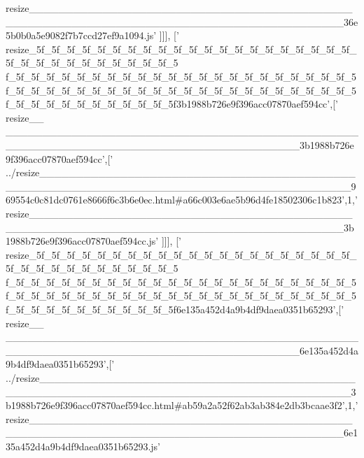 \begin{DoxyCode}
{      resize\_\_\_\_\_\_\_\_\_\_\_\_\_\_\_\_\_\_\_\_\_\_\_\_\_\_\_\_\_\_\_\_\_\_\_\_\_\_\_\_\_\_\_\_\_\_\_\_\_\_\_\_\_\_\_\_\_\_\_\_\_\_\_\_\_\_\_\_\_\_\_\_\_\_\_\_\_\_\_\_\_\_\_\_\_\_\_\_\_\_36e5b0b0a5e9082f7b7ccd27ef9a1094.js'}
      ]]],
  [\textcolor{stringliteral}{'
      resize\_5f\_5f\_5f\_5f\_5f\_5f\_5f\_5f\_5f\_5f\_5f\_5f\_5f\_5f\_5f\_5f\_5f\_5f\_5f\_5f\_5f\_5f\_5f\_5f\_5f\_5f\_5f\_5f\_5f\_5f\_5f\_5f\_5
      f\_5f\_5f\_5f\_5f\_5f\_5f\_5f\_5f\_5f\_5f\_5f\_5f\_5f\_5f\_5f\_5f\_5f\_5f\_5f\_5f\_5f\_5f\_5f\_5f\_5f\_5f\_5f\_5f\_5f\_5f\_5f\_5f\_5f\_5f\_5f\_5f\_5f\_5f\_5f\_5f\_5f\_5f\_5f\_5f\_5f\_5f\_5f\_5f\_5f\_5f\_5f\_5f\_5f\_5f\_5f\_5f\_5f3b1988b726e9f396acc07870aef594cc'},[\textcolor{stringliteral}{'
      resize\_\_
      \_\_\_\_\_\_\_\_\_\_\_\_\_\_\_\_\_\_\_\_\_\_\_\_\_\_\_\_\_\_\_\_\_\_\_\_\_\_\_\_\_\_\_\_\_\_\_\_\_\_\_\_\_\_\_\_\_\_\_\_\_\_\_\_\_\_\_\_\_\_\_\_\_\_\_\_\_\_\_\_\_\_\_\_\_\_\_\_3b1988b726e9f396acc07870aef594cc'},[\textcolor{stringliteral}{'
      ../resize\_\_\_\_\_\_\_\_\_\_\_\_\_\_\_\_\_\_\_\_\_\_\_\_\_\_\_\_\_\_\_\_\_\_\_\_\_\_\_\_\_\_\_\_\_\_\_\_\_\_\_\_\_\_\_\_\_\_\_\_\_\_\_\_\_\_\_\_\_\_\_\_\_\_\_\_\_\_\_\_\_\_\_\_\_\_\_\_\_\_969554c0c81dc0761e8666f6c3b6e0ec.html#a66c003e6ae5b96d4fe18502306c1b823'},1,\textcolor{stringliteral}{'
      resize\_\_\_\_\_\_\_\_\_\_\_\_\_\_\_\_\_\_\_\_\_\_\_\_\_\_\_\_\_\_\_\_\_\_\_\_\_\_\_\_\_\_\_\_\_\_\_\_\_\_\_\_\_\_\_\_\_\_\_\_\_\_\_\_\_\_\_\_\_\_\_\_\_\_\_\_\_\_\_\_\_\_\_\_\_\_\_\_\_\_3b1988b726e9f396acc07870aef594cc.js'}
      ]]],
  [\textcolor{stringliteral}{'
      resize\_5f\_5f\_5f\_5f\_5f\_5f\_5f\_5f\_5f\_5f\_5f\_5f\_5f\_5f\_5f\_5f\_5f\_5f\_5f\_5f\_5f\_5f\_5f\_5f\_5f\_5f\_5f\_5f\_5f\_5f\_5f\_5f\_5
      f\_5f\_5f\_5f\_5f\_5f\_5f\_5f\_5f\_5f\_5f\_5f\_5f\_5f\_5f\_5f\_5f\_5f\_5f\_5f\_5f\_5f\_5f\_5f\_5f\_5f\_5f\_5f\_5f\_5f\_5f\_5f\_5f\_5f\_5f\_5f\_5f\_5f\_5f\_5f\_5f\_5f\_5f\_5f\_5f\_5f\_5f\_5f\_5f\_5f\_5f\_5f\_5f\_5f\_5f\_5f\_5f\_5f6e135a452d4a9b4df9daea0351b65293'},[\textcolor{stringliteral}{'
      resize\_\_
      \_\_\_\_\_\_\_\_\_\_\_\_\_\_\_\_\_\_\_\_\_\_\_\_\_\_\_\_\_\_\_\_\_\_\_\_\_\_\_\_\_\_\_\_\_\_\_\_\_\_\_\_\_\_\_\_\_\_\_\_\_\_\_\_\_\_\_\_\_\_\_\_\_\_\_\_\_\_\_\_\_\_\_\_\_\_\_\_6e135a452d4a9b4df9daea0351b65293'},[\textcolor{stringliteral}{'
      ../resize\_\_\_\_\_\_\_\_\_\_\_\_\_\_\_\_\_\_\_\_\_\_\_\_\_\_\_\_\_\_\_\_\_\_\_\_\_\_\_\_\_\_\_\_\_\_\_\_\_\_\_\_\_\_\_\_\_\_\_\_\_\_\_\_\_\_\_\_\_\_\_\_\_\_\_\_\_\_\_\_\_\_\_\_\_\_\_\_\_\_3b1988b726e9f396acc07870aef594cc.html#ab59a2a52f62ab3ab384e2db3bcaae3f2'},1,\textcolor{stringliteral}{'
      resize\_\_\_\_\_\_\_\_\_\_\_\_\_\_\_\_\_\_\_\_\_\_\_\_\_\_\_\_\_\_\_\_\_\_\_\_\_\_\_\_\_\_\_\_\_\_\_\_\_\_\_\_\_\_\_\_\_\_\_\_\_\_\_\_\_\_\_\_\_\_\_\_\_\_\_\_\_\_\_\_\_\_\_\_\_\_\_\_\_\_6e135a452d4a9b4df9daea0351b65293.js'}

\end{DoxyCode}
